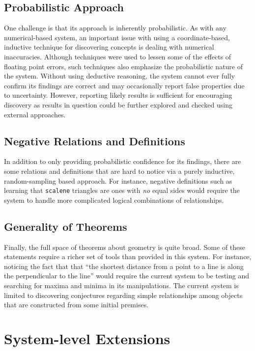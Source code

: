 \subsection{Probabilistic Approach}

One challenge is that its approach is inherently probabilistic. As
with any numerical-based system, an important issue with using a
coordinate-based, inductive technique for discovering concepts is
dealing with numerical inaccuracies. Although techniques were used to
lessen some of the effects of floating point errors, such techniques
also emphasize the probabilistic nature of the system.  Without using
deductive reasoning, the system cannot ever fully confirm its findings
are correct and may occasionally report false properties due to
uncertainty. However, reporting likely results is sufficient for
encouraging discovery as results in question could be further explored
and checked using external approaches.

\subsection{Negative Relations and Definitions}

In addition to only providing probabilistic confidence for its
findings, there are some relations and definitions that are hard to
notice via a purely inductive, random-sampling based approach. For
instance, negative definitions such as learning that \texttt{scalene}
triangles are ones with \emph{no} equal sides would require the system
to handle more complicated logical combinations of relationships.

\subsection{Generality of Theorems}

Finally, the full space of theorems about geometry is quite broad.
Some of these statements require a richer set of tools than provided
in this system. For instance, noticing the fact that that ``the
shortest distance from a point to a line is along the perpendicular to
the line'' would require the current system to be testing and
searching for maxima and minima in its manipulations. The current
system is limited to discovering conjectures regarding simple
relationships among objects that are constructed from some initial
premises.

\section{System-level Extensions}

